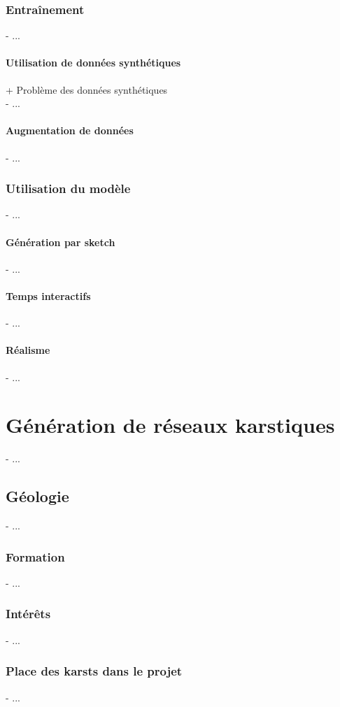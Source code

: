 \subsection{Entraînement}
- ...
\subsubsection{Utilisation de données synthétiques}
+ Problème des données synthétiques \\
- ...
\subsubsection{Augmentation de données}
- ...
\subsection{Utilisation du modèle}
- ...
\subsubsection{Génération par sketch}
- ...
\subsubsection{Temps interactifs}
- ...
\subsubsection{Réalisme}
- ...




\chapter{Génération de réseaux karstiques}
- ...

\section{Géologie}
- ...

\subsection{Formation}
- ...

\subsection{Intérêts}
- ...

\subsection{Place des karsts dans le projet}
- ...

